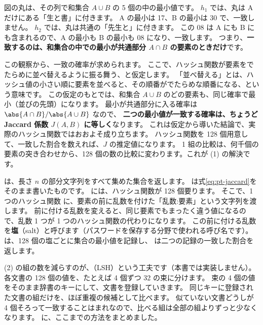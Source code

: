 図の丸は、その列で和集合 $A\cup B$ の 5 個の中の最小値です。
$h_1$ では、丸は A だけにある「生と書」に付きます。
A の最小は 17、B の最小は 30 で、一致しません。
$h_2$ では、丸は共通の「先生と」に付きます。
この 08 は A にも B にも含まれるので、A の最小も B の最小も 08 になり、一致します。
つまり、\textbf{一致するのは、和集合の中での最小が共通部分 $A\cap B$ の要素のときだけ}です。

この観察から、一致の確率が求められます。
ここで、ハッシュ関数が要素をでたらめに並べ替えるように振る舞う、と仮定します。
「並べ替える」とは、ハッシュ値の小さい順に要素を並べると、その順番がでたらめな順番になる、という意味です。
この仮定のもとでは、和集合 $A\cup B$ のどの要素も、同じ確率で最小（並びの先頭）になります。
最小が共通部分に入る確率は $\abs{A\cap B}/\abs{A\cup B}$ なので、
\textbf{二つの最小値が一致する確率は、ちょうど Jaccard 係数 $J(A,B)$ に等しく}なります。
これは仮定から導いた結論で、実際のハッシュ関数ではおおよそ成り立ちます。
ハッシュ関数を 128 個用意して、一致した割合を数えれば、$J$ の推定値になります。
1 組の比較は、何千個の要素の突き合わせから、128 個の数の比較に変わります。これが (1) の解決です。


 は、長さ $n$ の部分文字列をすべて集めた集合を返します。
 は式\eqref{eq:pt-jaccard}をそのまま書いたものです。
 には、ハッシュ関数が 128 個要ります。
そこで、1 つのハッシュ関数  に、要素の前に乱数を付けた「乱数:要素」という文字列を渡します。
前に付ける乱数を変えると、同じ要素でもまったく違う値になるので、乱数 1 つが 1 つのハッシュ関数の代わりになります。
この前に付ける乱数を\textbf{塩}（salt）と呼びます（パスワードを保存する分野で使われる呼び名です）。
 は、128 個の塩ごとに集合の最小値を記録し、 は二つの記録の一致した割合を返します。

(2) の組の数を減らすのが、（LSH）という工夫です（本書では実装しません）。
各文書の 128 個の値を、たとえば 4 個ずつ 32 の束に分けます。
束の 4 個の値をそのまま辞書のキーにして、文書を登録していきます。
同じキーに登録された文書の組だけを、ほぼ重複の候補として比べます。
似ていない文書どうしが 4 個そろって一致することはまれなので、比べる組は全部の組よりずっと少なくなります。
に、ここまでの方法をまとめました。

